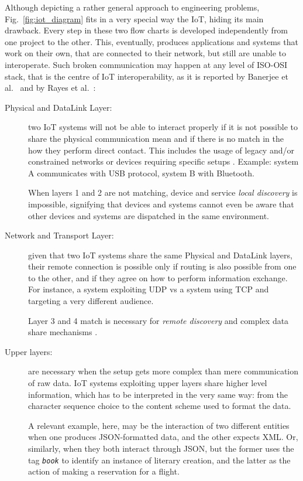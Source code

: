 Although depicting a rather general approach to engineering problems, Fig.~\ref{fig:iot_diagram} fits in a very special way the IoT, hiding its main drawback. Every step in these two flow charts is developed independently from one project to the other. This, eventually, produces applications and systems that work on their own, that are connected to their network, but still are unable to interoperate. Such broken communication may happen at any level of ISO-OSI stack, that is the centre of IoT interoperability, as it is reported by Banerjee et al.~\cite{banerjee2017iot} and by Rayes et al.~\cite{rayes2017internet}:
\begin{description}
\item[Physical and DataLink Layer: ] two IoT systems will not be able to interact properly if it is not possible to share the physical communication mean and if there is no match in the how they perform direct contact. This includes the usage of legacy and/or constrained networks or devices requiring specific setups \cite{bormann2014terminology}. Example: system A communicates with USB protocol, system B with Bluetooth.

When layers 1 and 2 are not matching, device and service \textit{local discovery} is impossible, signifying that devices and systems cannot even be aware that other devices and systems are dispatched in the same environment.
\item[Network and Transport Layer: ] given that two IoT systems share the same Physical and DataLink layers, their remote connection is possible only if routing is also possible from one to the other, and if they agree on how to perform information exchange. For instance, a system exploiting UDP vs a system using TCP and targeting a very different audience.

Layer 3 and 4 match is necessary for \textit{remote discovery} and complex data share mechanisms \cite{bello2017network}. 

\item[Upper layers: ] are necessary when the setup gets more complex than mere communication of raw data. IoT systems exploiting upper layers share higher level information, which has to be interpreted in the very same way: from the character sequence choice to the content scheme used to format the data.

A relevant example, here, may be the interaction of two different entities when one produces JSON-formatted data, and the other expects XML. Or, similarly, when they both interact through JSON, but the former uses the tag \textit{\texttt{book}} to identify an instance of literary creation, and the latter as the action of making a reservation for a flight.
\end{description}

